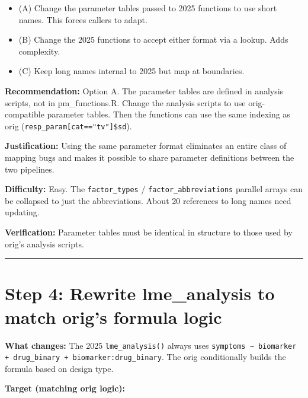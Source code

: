 \documentclass[11pt]{article}
\begin{document}
\begin{itemize}
  \item (A) Change the parameter tables passed to 2025 functions to use
    short names. This forces callers to adapt.
  \item (B) Change the 2025 functions to accept either format via a
    lookup. Adds complexity.
  \item (C) Keep long names internal to 2025 but map at boundaries.
\end{itemize}

\textbf{Recommendation:} Option A. The parameter tables are defined in
analysis scripts, not in pm\_functions.R. Change the analysis scripts
to use orig-compatible parameter tables. Then the functions can use
the same indexing as orig (\texttt{resp\_param[cat=="tv"]\$sd}).

\textbf{Justification:} Using the same parameter format eliminates an
entire class of mapping bugs and makes it possible to share
parameter definitions between the two pipelines.

\textbf{Difficulty:} Easy. The \texttt{factor\_types} / \texttt{factor\_abbreviations}
parallel arrays can be collapsed to just the abbreviations. About
20 references to long names need updating.

\textbf{Verification:} Parameter tables must be identical in structure
to those used by orig's analysis scripts.

\bigskip\noindent\rule{\textwidth}{0.4pt}\bigskip

\section{Step 4: Rewrite lme\_analysis to match orig's formula logic}

\textbf{What changes:} The 2025 \texttt{lme\_analysis()} always uses
\texttt{symptoms \textasciitilde{} biomarker + drug\_binary + biomarker:drug\_binary}.
The orig conditionally builds the formula based on design type.

\textbf{Target (matching orig logic):}
\end{document}
